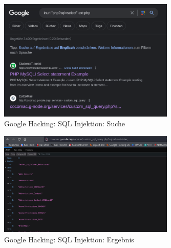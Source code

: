 \documentclass{article}
\begin{document}
\begin{figure}[H]
	\includegraphics[width=0.75\textwidth]{images/22}
	\centering
	\caption{Google Hacking: SQL Injektion: Suche}
\end{figure}


\begin{figure}[H]
	\includegraphics[width=0.75\textwidth]{images/23}
	\centering
	\caption{Google Hacking: SQL Injektion: Ergebnis}
\end{figure}
\end{document}
